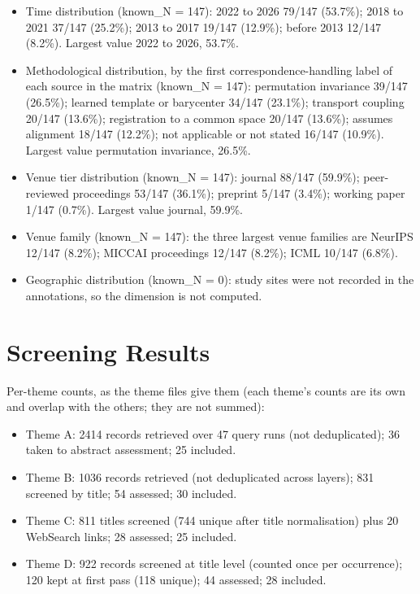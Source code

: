 \documentclass[journal,onecolumn]{IEEEtran}
\begin{document}
\begin{itemize}

\item{} Time distribution (known\_N = 147): 2022 to 2026 79/147 (53.7\%); 2018 to 2021 37/147 (25.2\%); 2013 to 2017 19/147 (12.9\%); before 2013 12/147 (8.2\%). Largest value 2022 to 2026, 53.7\%.

\item{} Methodological distribution, by the first correspondence-handling label of each source in the matrix (known\_N = 147): permutation invariance 39/147 (26.5\%); learned template or barycenter 34/147 (23.1\%); transport coupling 20/147 (13.6\%); registration to a common space 20/147 (13.6\%); assumes alignment 18/147 (12.2\%); not applicable or not stated 16/147 (10.9\%). Largest value permutation invariance, 26.5\%.

\item{} Venue tier distribution (known\_N = 147): journal 88/147 (59.9\%); peer-reviewed proceedings 53/147 (36.1\%); preprint 5/147 (3.4\%); working paper 1/147 (0.7\%). Largest value journal, 59.9\%.

\item{} Venue family (known\_N = 147): the three largest venue families are NeurIPS 12/147 (8.2\%); MICCAI proceedings 12/147 (8.2\%); ICML 10/147 (6.8\%).

\item{} Geographic distribution (known\_N = 0): study sites were not recorded in the annotations, so the dimension is not computed.

\end{itemize}

\section{Screening Results}

Per-theme counts, as the theme files give them (each theme's counts are its own and overlap with the others; they are not summed):

\begin{itemize}

\item{} Theme A: 2414 records retrieved over 47 query runs (not deduplicated); 36 taken to abstract assessment; 25 included.

\item{} Theme B: 1036 records retrieved (not deduplicated across layers); 831 screened by title; 54 assessed; 30 included.

\item{} Theme C: 811 titles screened (744 unique after title normalisation) plus 20 WebSearch links; 28 assessed; 25 included.

\item{} Theme D: 922 records screened at title level (counted once per occurrence); 120 kept at first pass (118 unique); 44 assessed; 28 included.

\end{itemize}
\end{document}
